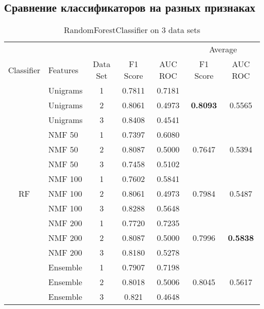 \documentclass[12pt, twoside]{article}
\title
    {Бинарная классификация движения цен по новостному потоку}
\author
    {Ахияров~Валентин} %
\begin{document}
\maketitle

\subsection{Сравнение классификаторов на разных признаках}

\begin{table}[!htbp]
  \centering
  \begin{tabular}{clccccc}
  \toprule
  {} & {} &	{}	& {}	&	{} & \multicolumn{2}{c}{Average} \\
  \cmidrule(r){6-7}
  Classifier	&	Features	&	Data Set	&	F1 Score	&	AUC ROC	&	F1 Score	&	AUC ROC \\
  \midrule
  	&	Unigrams	&	1	&	0.7811	&	0.7181	&		&	 \\
  	&	Unigrams	&	2	&	0.8061	&	0.4973	&	\textbf{0.8093}	&	0.5565 \\
  	&	Unigrams	&	3	&	0.8408	&	0.4541	&		&	 \\
  	\cmidrule(r){2-7}
  	&	NMF 50	&	1	&	0.7397	&	0.6080	&		&	 \\
  	&	NMF 50	&	2	&	0.8087	&	0.5000	&	0.7647	&	0.5394 \\
  	&	NMF 50	&	3	&	0.7458	&	0.5102	&		&	 \\
  	\cmidrule(r){2-7}
  	&	NMF 100	&	1	&	0.7602	&	0.5841	&		&	 \\
  RF	&	NMF 100	&	2	&	0.8061	&	0.4973	&	0.7984	&	0.5487 \\
  	&	NMF 100	&	3	&	0.8288	&	0.5648	&		&	 \\
  	\cmidrule(r){2-7}
  	&	NMF 200	&	1	&	0.7720	&	0.7235	&		&	 \\
  	&	NMF 200	&	2	&	0.8087	&	0.5000	&	0.7996	&	\textbf{0.5838} \\
  	&	NMF 200	&	3	&	0.8180	&	0.5278	&		&	 \\
  	\cmidrule(r){2-7}
  	&	Ensemble	&	1	&	0.7907	&	0.7198	&		&	 \\
  	&	Ensemble	&	2	&	0.8018	&	0.5006	&	0.8045	&	0.5617 \\
  	&	Ensemble	&	3	&	0.821	&	0.4648	&		&	 \\
  \bottomrule
  \end{tabular}
  \caption{RandomForestClassifier on 3 data sets}
\end{table}
\end{document}
